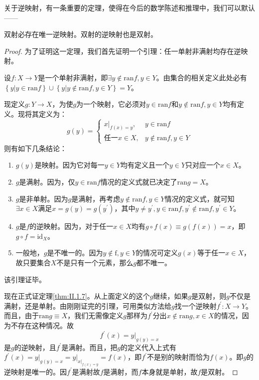 \documentclass[main.tex]{subfiles}
\begin{document}
关于逆映射，有一条重要的定理，使得在今后的数学陈述和推理中，我们可以默认——
\begin{theorem}\label{thm:II.1.7}
双射必存在唯一逆映射。双射的逆映射也是双射。
\end{theorem}
\begin{proof}
为了证明这一定理，我们首先证明一个引理：任一单射非满射均存在逆映射。

设$f:X\rightarrow Y$是一个单射非满射，即$\exists y\notin\mathrm{ran}f,y\in Y$。由集合的相关定义此处必有$\left\{y|y\in\mathrm{ran}f\right\}\cup\left\{y|y\notin\mathrm{ran}f,y\in Y\right\}=Y$。

现定义$g:Y\rightarrow X$，为使$g$为一个映射，它必须对$y\in\mathrm{ran}f$和$y\notin\mathrm{ran}f,y\in Y$均有定义。现将其定义为：
\[
g\left(y\right)=\left\{
\begin{array}{ll}
\left.x\right|_{f\left(x\right)=y},&y\in\mathrm{ran}f\\
\text{任一}x\in X,&y\notin\mathrm{ran}f,y\in Y
\end{array}
\right.
\]
则有如下几条结论：
\begin{enumerate}
    \item $g\left(y\right)$是映射。因为它对每一$y\in Y$均有定义且一个$y\in Y$只对应一个$x\in X$。
    \item $g$是满射。因为，仅$y\in\mathrm{ran}f$情况的定义式就已决定了$\mathrm{ran}g=X$。
    \item $g$是非单射。因为$g$是满射，再考虑$y\notin\mathrm{ran}f,y\in Y$情况的定义式，就可知$\exists x\in X$满足$x=g\left(y\right)=g\left(y^\prime\right)$，其中$y\neq y^\prime,y\in\mathrm{ran}f,y^\prime\notin\mathrm{ran}f,y^\prime\in Y$。
    \item $g$是$f$的逆映射。因为，对于任一$x\in X$均有$g\circ f\left(x\right)\equiv g\left(f\left(x\right)\right)=x$，即$g\circ f=\mathrm{id}_X$。
    \item 一般地，$g$是不唯一的。因为$y\notin\mathrm{f},y\in Y$的情况可定义$g\left(x\right)$等于任一$x\in X$，故只要集合$X$不是只有一个元素，那么$g$都不唯一。
\end{enumerate}
该引理证毕。

现在正式证定理\ref{thm:II.1.7}。从上面定义的这个$g$继续，如果$g$是双射，则$g$不仅是满射，还是单射。由刚刚证完的引理，可用类似方法给$g$找一个逆映射$f^\prime:X\rightarrow Y$。而且，由于$\mathrm{ran}g\equiv X$，我们无需像定义$g$那样为$f^\prime$分出$x\notin\mathrm{ran}g,x\in X$的情况，因为不存在这种情况。故
\[
f^\prime\left(x\right)=\left.y\right|_{g\left(y\right)=x}
\]
是$g$的逆映射，且$f^\prime$是满射。而且，把$g$的定义代入上式有$f^\prime\left(x\right)=\left.y\right|_{g\left(y\right)=x}=\left.y\right|_{\left.x\right|_{f\left(x\right)=y}}=f\left(x\right)$，即$f^\prime$不是别的映射而恰为$f\left(x\right)$。即$g$的逆映射是唯一的。因$f^\prime$是满射故$f$是满射，而$f$本身就是单射，故$f$是双射。
\end{proof}
\end{document}
